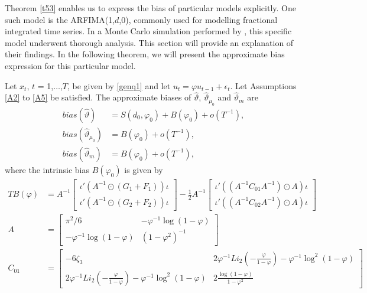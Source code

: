 {{Theorem \ref{t53} enables us to express the bias of particular models explicitly. One such model is the ARFIMA(1,$d$,0), commonly used for modelling fractional integrated time series. In a Monte Carlo simulation performed by \textcite{nielsen2005finite}, this specific model underwent thorough analysis. This section will provide an explanation of their findings. In the following theorem, we will present the approximate bias expression for this particular model.
\begin{theorem}\label{t54} 
Let $x_t$, $t$ = 1,$\ldots$,$T$, be given by \eqref{genq1} and let $u_t = \varphi u_{t-1} + \epsilon_t$. Let Assumptions \ref{A2} to \ref{A5} be satisfied. The approximate biases of $\hat{\vartheta}$, $\hat{\vartheta}_{\mu_0}$ and $\hat{\vartheta}_{m}$ are 
\begin{align}
    bias(\hat{\vartheta}) &= S(d_0,\varphi_0)  + B(\varphi_0) + o(T^{-1}), \\
    bias(\hat{\vartheta}_{\mu_0}) &= B(\varphi_0) + o(T^{-1}), \\
    bias(\hat{\vartheta}_{m}) &=  B(\varphi_0) + o(T^{-1}),
\end{align}
where the intrinsic bias $B(\varphi_0)$ is given by 
\begin{align*}
    T B(\varphi) &=   A^{-1}   \begin{bmatrix}
\iota' \left( A^{-1} \odot \left(G_1 + F_1 \right) \right)\iota \\
\iota' \left( A^{-1} \odot \left(G_2 + F_2 \right) \right)\iota 
\end{bmatrix} - \frac{1}{2} A^{-1} \begin{bmatrix}
\iota' \left(\left(A^{-1} C_{01} A^{-1} \right) \odot A \right) \iota \\
\iota' \left(\left(A^{-1} C_{02} A^{-1} \right) \odot A \right) \iota
\end{bmatrix} \\
 A &= \begin{bmatrix}
\pi^2/6 &  - \varphi^{-1} \log(1-\varphi) \\
 - \varphi^{-1} \log(1-\varphi)  &  (1-\varphi^2)^{-1}
\end{bmatrix}  \\
C_{01} &= \begin{bmatrix}
  -6 \zeta_3 &  2 \varphi^{-1} Li_{2}(-\frac{\varphi}{1-\varphi}) - \varphi^{-1} \log^2(1-\varphi) \\
 2 \varphi^{-1} Li_{2}(-\frac{\varphi}{1-\varphi}) - \varphi^{-1} \log^2(1-\varphi)  & 2 \frac{\log(1 - \varphi)}{1-\varphi^2}
\end{bmatrix} \\

\end{align*}
\end{theorem}}}
